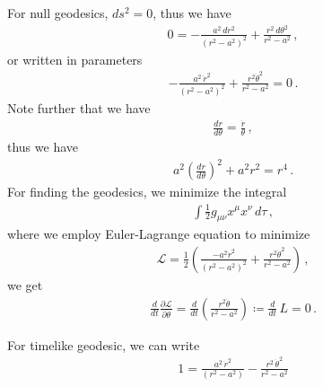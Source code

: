 \documentclass[11pt, onesided]{book}
\theoremstyle{break}
\theoremstyle{break}
\newcommand{\pd}{\partial}
\begin{document}
For null geodesics, $ds^2 =0$, thus we have
\begin{align*}
0 = -\frac{a^2\, dr^2}{(r^2 - a^2)^2} + \frac{r^2\, d\theta^2}{r^2 - a^2}\,,
\end{align*}
or written in parameters
\begin{align*}
-\frac{a^2 \, \dot{r}^2}{(r^2 - a^2)^2} + \frac{r^2 \dot{\theta}^2}{r^2 - a^2} = 0\,.
\end{align*}
Note further that we have
\begin{align*}
\frac{dr}{d\theta} = \frac{\dot{r}}{\theta}\,,
\end{align*}
thus we have
\begin{align*}
a^2\left( \frac{dr}{d\theta}\right)^2 + a^2 r^2 = r^4\,.
\end{align*}
For finding the geodesics, we minimize the integral
\begin{align*}
\int \frac{1}{2}g_{\mu\nu}x^\mu x^\nu \, d\tau\,,
\end{align*}
where we employ Euler-Lagrange equation to minimize
\begin{align*}
\mathcal{L} = \frac{1}{2}\left( \frac{-a^2\dot{r}^2}{(r^2 -a^2)^2} + \frac{r^2 \dot{\theta}^2}{r^2 - a^2}\right)\,,
\end{align*}
we get
\begin{align*}
\frac{d}{dt}\frac{\pd \mathcal{L}}{\pd \dot{\theta}} = \frac{d}{dt}\left(\frac{r^2 \dot{\theta}}{r^2 - a^2}  \right)\coloneqq \frac{d}{dt}\, L = 0\,.
\end{align*}

For timelike geodesic, we can write
\begin{align*}
1 = \frac{a^2\, \dot{r}^2}{(r^2 - a^2)} - \frac{r^2\, \dot{\theta}^2}{r^2 - a^2}
\end{align*}
\end{document}

